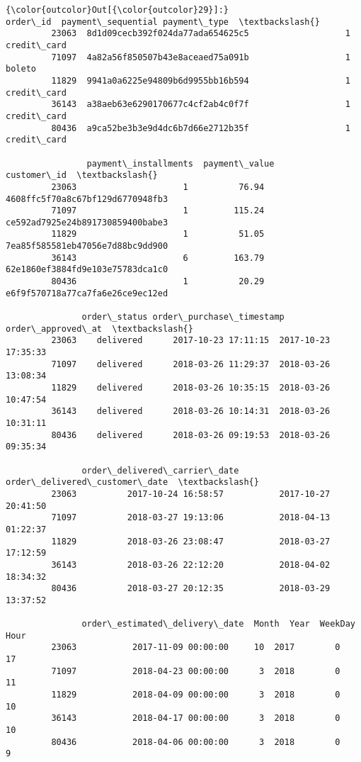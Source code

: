 \documentclass[11pt]{article}
\begin{document}
\begin{Verbatim}[commandchars=\\\{\}]
{\color{outcolor}Out[{\color{outcolor}29}]:}                                order\_id  payment\_sequential payment\_type  \textbackslash{}
         23063  8d1d09cecb392f024da77ada654625c5                   1  credit\_card   
         71097  4a82a56f850507b43e8aceaed75a091b                   1       boleto   
         11829  9941a0a6225e94809b6d9955bb16b594                   1  credit\_card   
         36143  a38aeb63e6290170677c4cf2ab4c0f7f                   1  credit\_card   
         80436  a9ca52be3b3e9d4dc6b7d66e2712b35f                   1  credit\_card   
         
                payment\_installments  payment\_value                       customer\_id  \textbackslash{}
         23063                     1          76.94  4608ffc5f70a8c67bf129d6770948fb3   
         71097                     1         115.24  ce592ad7925e24b891730859400babe3   
         11829                     1          51.05  7ea85f585581eb47056e7d88bc9dd900   
         36143                     6         163.79  62e1860ef3884fd9e103e75783dca1c0   
         80436                     1          20.29  e6f9f570718a77ca7fa6e26ce9ec12ed   
         
               order\_status order\_purchase\_timestamp    order\_approved\_at  \textbackslash{}
         23063    delivered      2017-10-23 17:11:15  2017-10-23 17:35:33   
         71097    delivered      2018-03-26 11:29:37  2018-03-26 13:08:34   
         11829    delivered      2018-03-26 10:35:15  2018-03-26 10:47:54   
         36143    delivered      2018-03-26 10:14:31  2018-03-26 10:31:11   
         80436    delivered      2018-03-26 09:19:53  2018-03-26 09:35:34   
         
               order\_delivered\_carrier\_date order\_delivered\_customer\_date  \textbackslash{}
         23063          2017-10-24 16:58:57           2017-10-27 20:41:50   
         71097          2018-03-27 19:13:06           2018-04-13 01:22:37   
         11829          2018-03-26 23:08:47           2018-03-27 17:12:59   
         36143          2018-03-26 22:12:20           2018-04-02 18:34:32   
         80436          2018-03-27 20:12:35           2018-03-29 13:37:52   
         
               order\_estimated\_delivery\_date  Month  Year  WeekDay  Hour  
         23063           2017-11-09 00:00:00     10  2017        0    17  
         71097           2018-04-23 00:00:00      3  2018        0    11  
         11829           2018-04-09 00:00:00      3  2018        0    10  
         36143           2018-04-17 00:00:00      3  2018        0    10  
         80436           2018-04-06 00:00:00      3  2018        0     9  
\end{Verbatim}
            
\end{document}
